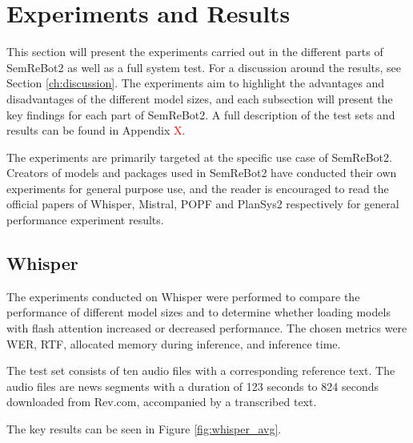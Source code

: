 \chapter{Experiments and Results}\label{ch:experiments}
This section will present the experiments carried out in the different parts of SemReBot2 as well as a full system test. For a discussion around the results, see Section \ref{ch:discussion}. The experiments aim to highlight the advantages and disadvantages of the different model sizes, and each subsection will present the key findings for each part of SemReBot2. A full description of the test sets and results can be found in Appendix \textcolor{red}{X}. 

The experiments are primarily targeted at the specific use case of SemReBot2. Creators of models and packages used in SemReBot2 have conducted their own experiments for general purpose use, and the reader is encouraged to read the official papers of Whisper\cite{radford_robust_2022}, Mistral\cite{jiang_mistral_2023}, POPF\cite{coles_forward-chaining_2021} and PlanSys2\cite{martin_plansys2_2021} respectively for general performance experiment results.

\section{Whisper}\label{sec:Whisper_experiments}
The experiments conducted on Whisper were performed to compare the performance of different model sizes and to determine whether loading models with flash attention increased or decreased performance. The chosen metrics were WER, RTF, allocated memory during inference, and inference time.

The test set consists of ten audio files with a corresponding reference text. The audio files are news segments with a duration of 123 seconds to 824 seconds downloaded from Rev.com\cite{revcom_transcript_2024}, accompanied by a transcribed text.

The key results can be seen in Figure \ref{fig:whisper_avg}.

